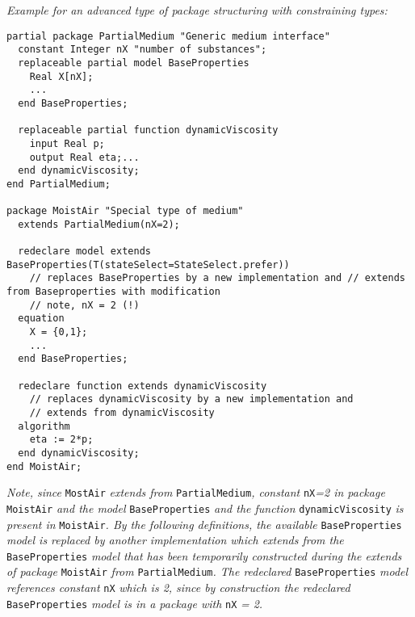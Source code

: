 \emph{Example for an advanced type of package structuring with
constraining types:}
\begin{lstlisting}[language=modelica]
partial package PartialMedium "Generic medium interface"
  constant Integer nX "number of substances";
  replaceable partial model BaseProperties
    Real X[nX];
    ...
  end BaseProperties;

  replaceable partial function dynamicViscosity
    input Real p;
    output Real eta;...
  end dynamicViscosity;
end PartialMedium;

package MoistAir "Special type of medium"
  extends PartialMedium(nX=2);

  redeclare model extends BaseProperties(T(stateSelect=StateSelect.prefer))
    // replaces BaseProperties by a new implementation and // extends from Baseproperties with modification
    // note, nX = 2 (!)
  equation
    X = {0,1};
    ...
  end BaseProperties;

  redeclare function extends dynamicViscosity
    // replaces dynamicViscosity by a new implementation and
    // extends from dynamicViscosity
  algorithm
    eta := 2*p;
  end dynamicViscosity;
end MoistAir;
\end{lstlisting}

\emph{Note, since} \lstinline[basicstyle=\ttfamily]!MostAir! \emph{extends from} \lstinline[basicstyle=\ttfamily]!PartialMedium!\emph{,
constant} \lstinline[basicstyle=\ttfamily]!nX!\emph{=2 in package} \lstinline[basicstyle=\ttfamily]!MoistAir! \emph{and the model}
\lstinline[basicstyle=\ttfamily]!BaseProperties! \emph{and the function} \lstinline[basicstyle=\ttfamily]!dynamicViscosity! \emph{is present
in} \lstinline[basicstyle=\ttfamily]!MoistAir!\emph{. By the following definitions, the available}
\lstinline[basicstyle=\ttfamily]!BaseProperties! \emph{model is replaced by another implementation which
extends from the} \lstinline[basicstyle=\ttfamily]!BaseProperties! \emph{model that has been temporarily
constructed during the extends of package} \lstinline[basicstyle=\ttfamily]!MoistAir! \emph{from}
\lstinline[basicstyle=\ttfamily]!PartialMedium!\emph{. The redeclared} \lstinline[basicstyle=\ttfamily]!BaseProperties! \emph{model
references constant} \lstinline[basicstyle=\ttfamily]!nX! \emph{which is 2, since by construction the
redeclared} \lstinline[basicstyle=\ttfamily]!BaseProperties! \emph{model is in a package with} \lstinline[basicstyle=\ttfamily]!nX! \emph{=
2.}

